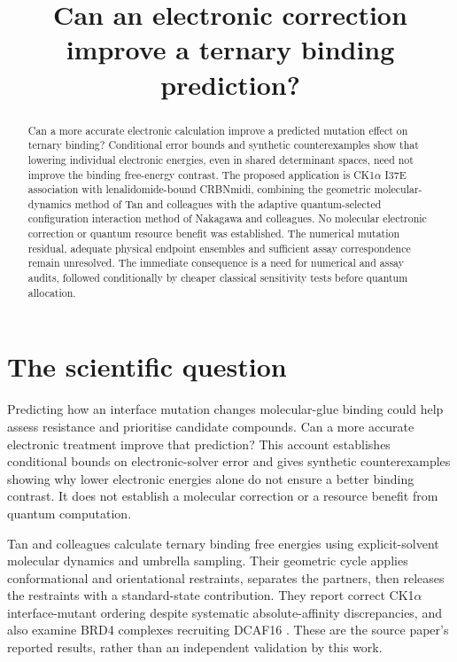 \documentclass{article}
\title{Can an electronic correction improve a ternary binding prediction?}
\begin{document}
\maketitle

\begin{abstract}
Can a more accurate electronic calculation improve a predicted mutation effect on ternary binding? Conditional error bounds and synthetic counterexamples show that lowering individual electronic energies, even in shared determinant spaces, need not improve the binding free-energy contrast. The proposed application is CK1\(\alpha\) I37E association with lenalidomide-bound CRBNmidi, combining the geometric molecular-dynamics method of Tan and colleagues with the adaptive quantum-selected configuration interaction method of Nakagawa and colleagues. No molecular electronic correction or quantum resource benefit was established. The numerical mutation residual, adequate physical endpoint ensembles and sufficient assay correspondence remain unresolved. The immediate consequence is a need for numerical and assay audits, followed conditionally by cheaper classical sensitivity tests before quantum allocation.
\end{abstract}

\section{The scientific question}

Predicting how an interface mutation changes molecular-glue binding could help assess resistance and prioritise candidate compounds. Can a more accurate electronic treatment improve that prediction? This account establishes conditional bounds on electronic-solver error and gives synthetic counterexamples showing why lower electronic energies alone do not ensure a better binding contrast. It does not establish a molecular correction or a resource benefit from quantum computation.

Tan and colleagues calculate ternary binding free energies using explicit-solvent molecular dynamics and umbrella sampling. Their geometric cycle applies conformational and orientational restraints, separates the partners, then releases the restraints with a standard-state contribution. They report correct CK1\(\alpha\) interface-mutant ordering despite systematic absolute-affinity discrepancies, and also examine BRD4 complexes recruiting DCAF16 \cite{Q}. These are the source paper's reported results, rather than an independent validation by this work.
\end{document}
